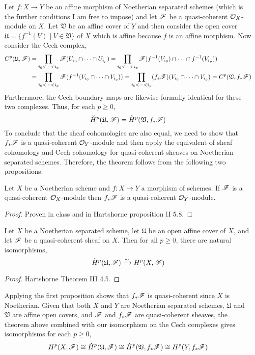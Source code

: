 \documentclass[12pt]{article}
\begin{document}
Let $f : X \to Y$ be an affine morphism of Noetherian separated schemes (which is the further conditions I am free to impose) and let $\mathscr{F}$ be a quasi-coherent $\mathcal{O}_{X}$-module on $X$. Let $\mathfrak{V}$ be an affine cover of $Y$ and then consider the open cover $\mathfrak{U} = \{ f^{-1}(V) \mid V \in \mathfrak{V} \}$ of $X$ which is affine because $f$ is an affine morphism. Now consider the Cech complex,
\begin{align*}
C^p(\mathfrak{U}, \mathscr{F}) & = \prod_{i_0 < \dots < i_p} \mathscr{F}(U_{i_0} \cap \cdots \cap U_{i_p}) = \prod_{i_0 < \dots < i_p} \mathscr{F}(f^{-1}(V_{i_0}) \cap \cdots \cap f^{-1}(V_{i_p})) 
\\
& = \prod_{i_0 < \dots < i_p} \mathscr{F}(f^{-1}(V_{i_0} \cap \cdots \cap V_{i_p})) 
= \prod_{i_0 < \dots < i_p} (f_*\mathscr{F})(V_{i_0} \cap \cdots \cap V_{i_p}) = C^p(\mathfrak{V}, f_* \mathscr{F})
\end{align*}
Furthermore, the Cech boundary maps are likewise formally identical for these two complexes. Thus, for each $p \ge 0$,
\[ \check{H}^p(\mathfrak{U}, \mathscr{F}) = \check{H}^p(\mathfrak{V}, f_* \mathscr{F}) \]
To conclude that the sheaf cohomologies are also equal, we need to show that $f_* \mathscr{F}$ is a quasi-coherent $\mathcal{O}_{Y}$-module and then apply the equivalent of sheaf cohomology and Cech cohomology for quasi-coherent sheaves on Noetherian separated schemes. Therefore, the theorem follows from the following two propositions.

\begin{proposition}
Let $X$ be a Noetherian scheme and $f : X \to Y$ a morphism of schemes. If $\mathscr{F}$ is a quasi-coherent $\mathcal{O}_{X}$-module then $f_* \mathscr{F}$  is a quasi-coherent $\mathcal{O}_{Y}$-module.
\end{proposition}

\begin{proof}
Proven in class and in Hartshorne proposition II 5.8.
\end{proof}

\begin{theorem}
Let $X$ be a Noetherian separated scheme, let $\mathfrak{U}$ be an open affine cover of $X$, and let $\mathscr{F}$ be a quasi-coherent sheaf on $X$. Then for all $ p \ge 0$, there are natural isomorphisms,
\[ \check{H}^p(\mathfrak{U}, \mathscr{F}) \xrightarrow{\sim} H^p(X, \mathscr{F}) \]
\end{theorem}

\begin{proof}
Hartshorne Theorem III 4.5. 
\end{proof}
\noindent
Applying the first proposition shows that $f_* \mathscr{F}$ is quasi-coherent since $X$ is Noetherian. Given that both $X$ and $Y$ are Noetherian separated schemes, $\mathfrak{U}$ and $\mathfrak{V}$ are affine open covers, and $\mathscr{F}$ and $f_* \mathscr{F}$ are quasi-coherent sheaves, the theorem above combined with our isomorphism on the Cech complexes gives isomorphisms for each $p \ge 0$,
\[ H^p(X, \mathscr{F}) \cong \check{H}^p(\mathfrak{U}, \mathscr{F}) \cong \check{H}^p(\mathfrak{V}, f_* \mathscr{F}) \cong H^p(Y, f_* \mathscr{F}) \]
\end{document}
